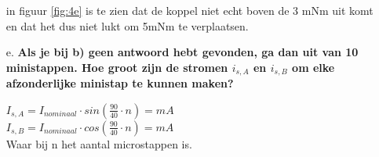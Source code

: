 \begin{enumerate}
        in figuur \ref{fig:4e} is te zien dat de koppel niet echt boven de 3 mNm uit komt en dat het dus niet lukt om 5mNm te verplaatsen.        

    \item [e.] \textbf{Als je bij b) geen antwoord hebt gevonden, ga dan uit van 10 ministappen.
    Hoe groot zijn de stromen $i_{s,A}$ en $i_{s,B}$ om elke afzonderlijke ministap te kunnen
    maken?}
    
        $I_{s,A} = I_{nominaal} \cdot sin(\frac{90}{40} \cdot n) = mA$\\
        $I_{s,B} = I_{nominaal} \cdot cos(\frac{90}{40} \cdot n) = mA$\\
        Waar bij n het aantal microstappen is.

\end{enumerate}
